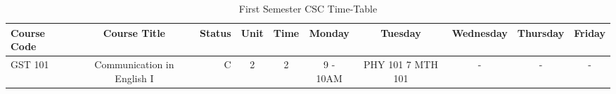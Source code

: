 \documentclass{article}
\begin{document}
	\begin{sidewaystable}[h!]
		\begin{center}
			\caption{First Semester CSC Time-Table}
			\label{tab:table1}
			\begin{tabular}{l|c|r|c|c|c|c|c|c|c|}
				\textbf{Course Code} & \textbf{Course Title} & \textbf{Status} & \textbf{Unit} & \textbf{Time} & \textbf{Monday} & \textbf{Tuesday} & \textbf{Wednesday} & \textbf{Thursday} & \textbf{Friday}\\
					\hline
					GST 101 & Communication in English I & C & 2 & 2 & 9 - 10AM & PHY 101 7 MTH 101 & - & - & - \\
					\end{tabular}
				\end{center}				
			\end{sidewaystable}
\end{document}
